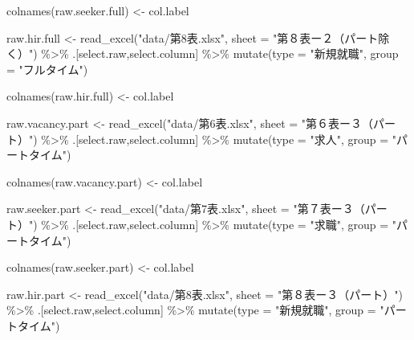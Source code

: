 \documentclass[
]{book}
\newenvironment{Shaded}{\begin{snugshade}}{\end{snugshade}}
\newcommand{\AttributeTok}[1]{\textcolor[rgb]{0.77,0.63,0.00}{#1}}
\newcommand{\FunctionTok}[1]{\textcolor[rgb]{0.00,0.00,0.00}{#1}}
\newcommand{\NormalTok}[1]{#1}
\newcommand{\OtherTok}[1]{\textcolor[rgb]{0.56,0.35,0.01}{#1}}
\newcommand{\SpecialCharTok}[1]{\textcolor[rgb]{0.00,0.00,0.00}{#1}}
\newcommand{\StringTok}[1]{\textcolor[rgb]{0.31,0.60,0.02}{#1}}
\begin{document}
\begin{Shaded}
\begin{Highlighting}[]
\FunctionTok{colnames}\NormalTok{(raw.seeker.full) }\OtherTok{\textless{}{-}}\NormalTok{ col.label}

\NormalTok{raw.hir.full }\OtherTok{\textless{}{-}}
  \FunctionTok{read\_excel}\NormalTok{(}\StringTok{"data/第8表.xlsx"}\NormalTok{,}
             \AttributeTok{sheet =} \StringTok{"第８表ー２（パート除く）"}\NormalTok{) }\SpecialCharTok{\%\textgreater{}\%}
\NormalTok{  .[select.raw,select.column] }\SpecialCharTok{\%\textgreater{}\%}
  \FunctionTok{mutate}\NormalTok{(}\AttributeTok{type =} \StringTok{"新規就職"}\NormalTok{,}
         \AttributeTok{group =} \StringTok{"フルタイム"}\NormalTok{)}

\FunctionTok{colnames}\NormalTok{(raw.hir.full) }\OtherTok{\textless{}{-}}\NormalTok{ col.label}


\NormalTok{raw.vacancy.part }\OtherTok{\textless{}{-}}
  \FunctionTok{read\_excel}\NormalTok{(}\StringTok{"data/第6表.xlsx"}\NormalTok{,}
             \AttributeTok{sheet =} \StringTok{"第６表ー３（パート）"}\NormalTok{) }\SpecialCharTok{\%\textgreater{}\%}
\NormalTok{  .[select.raw,select.column] }\SpecialCharTok{\%\textgreater{}\%}
  \FunctionTok{mutate}\NormalTok{(}\AttributeTok{type =} \StringTok{"求人"}\NormalTok{,}
         \AttributeTok{group =} \StringTok{"パートタイム"}\NormalTok{)}

\FunctionTok{colnames}\NormalTok{(raw.vacancy.part) }\OtherTok{\textless{}{-}}\NormalTok{ col.label}

\NormalTok{raw.seeker.part }\OtherTok{\textless{}{-}}
  \FunctionTok{read\_excel}\NormalTok{(}\StringTok{"data/第7表.xlsx"}\NormalTok{,}
             \AttributeTok{sheet =} \StringTok{"第７表ー３（パート）"}\NormalTok{) }\SpecialCharTok{\%\textgreater{}\%}
\NormalTok{  .[select.raw,select.column] }\SpecialCharTok{\%\textgreater{}\%}
  \FunctionTok{mutate}\NormalTok{(}\AttributeTok{type =} \StringTok{"求職"}\NormalTok{,}
         \AttributeTok{group =} \StringTok{"パートタイム"}\NormalTok{)}

\FunctionTok{colnames}\NormalTok{(raw.seeker.part) }\OtherTok{\textless{}{-}}\NormalTok{ col.label}

\NormalTok{raw.hir.part }\OtherTok{\textless{}{-}}
  \FunctionTok{read\_excel}\NormalTok{(}\StringTok{"data/第8表.xlsx"}\NormalTok{,}
             \AttributeTok{sheet =} \StringTok{"第８表ー３（パート）"}\NormalTok{) }\SpecialCharTok{\%\textgreater{}\%}
\NormalTok{  .[select.raw,select.column] }\SpecialCharTok{\%\textgreater{}\%}
  \FunctionTok{mutate}\NormalTok{(}\AttributeTok{type =} \StringTok{"新規就職"}\NormalTok{,}
         \AttributeTok{group =} \StringTok{"パートタイム"}\NormalTok{)}


\end{Highlighting}
\end{Shaded}
\end{document}
